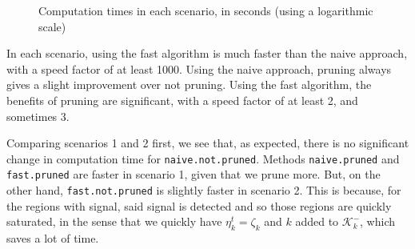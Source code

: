 \documentclass[
  11pt,
  a4paper,
]{article}
\theoremstyle{plain}
\theoremstyle{definition}
\theoremstyle{plain}
\theoremstyle{definition}
\theoremstyle{plain}
\theoremstyle{remark}
\begin{document}
\begin{figure}


\caption{\label{fig-benchmark01}Computation times in each scenario, in
seconds (using a logarithmic scale)}

\end{figure}%

In each scenario, using the fast algorithm is much faster than the naive
approach, with a speed factor of at least 1000. Using the naive
approach, pruning always gives a slight improvement over not pruning.
Using the fast algorithm, the benefits of pruning are significant, with
a speed factor of at least 2, and sometimes 3.

Comparing scenarios 1 and 2 first, we see that, as expected, there is no
significant change in computation time for \texttt{naive.not.pruned}.
Methods \texttt{naive.pruned} and \texttt{fast.pruned} are faster in
scenario 1, given that we prune more. But, on the other hand,
\texttt{fast.not.pruned} is slightly faster in scenario 2. This is
because, for the regions with signal, said signal is detected and so
those regions are quickly saturated, in the sense that we quickly have
\(\eta_k^t=\zeta_k\) and \(k\) added to \(\mathcal{K}^-_k\), which saves
a lot of time.
\end{document}
